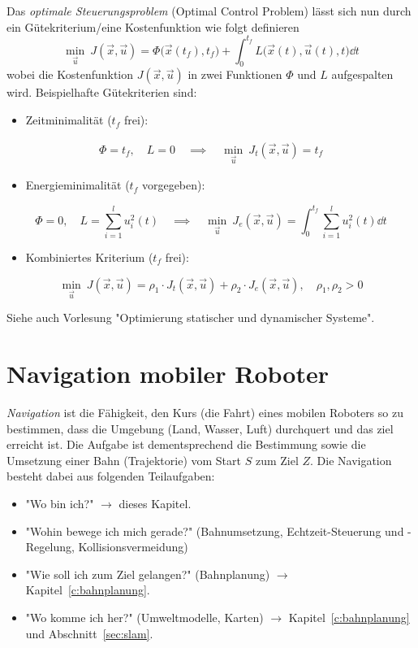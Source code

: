 			Das \emph{optimale Steuerungsproblem} (Optimal Control Problem) lässt sich nun durch ein Gütekriterium/eine Kostenfunktion wie folgt definieren
			\begin{equation*}
				\min_{\vec{u}} \> J(\vec{x}, \vec{u}) = \Phi\big(\vec{x}(t_f), t_f\big) + \int_{0}^{t_f} \! L\big(\vec{x}(t), \vec{u}(t), t\big) \dd{t}
			\end{equation*}
			wobei die Kostenfunktion \( J(\vec{x}, \vec{u}) \) in zwei Funktionen \( \Phi \) und \( L \) aufgespalten wird. Beispielhafte Gütekriterien sind:
			\begin{itemize}
				\item Zeitminimalität (\(t_f\) frei):
			\end{itemize}
			\begin{gather*}
				\Phi = t_f,\quad L = 0 \quad\implies\quad \min_{\vec{u}} \> J_t(\vec{x}, \vec{u}) = t_f
			\end{gather*}
			\begin{itemize}
				\item Energieminimalität (\(t_f\) vorgegeben):
			\end{itemize}
			\begin{equation*}
				\Phi = 0,\quad L = \sum_{i = 1}^{l} u_i^2 (t) \quad\implies\quad \min_{\vec{u}} \> J_e(\vec{x}, \vec{u}) = \int_{0}^{t_f} \! \sum_{i = 1}^{l} u_i^2 (t) \dd{t}
			\end{equation*}
			\begin{itemize}
				\item Kombiniertes Kriterium (\(t_f\) frei):
			\end{itemize}
			\begin{equation*}
				\min_{\vec{u}} \> J(\vec{x}, \vec{u}) = \rho_1 \cdot J_t(\vec{x}, \vec{u}) + \rho_2 \cdot J_e(\vec{x}, \vec{u}),\quad \rho_1, \rho_2 > 0
			\end{equation*}

			Siehe auch Vorlesung "Optimierung statischer und dynamischer Systeme".

\chapter{Navigation mobiler Roboter}
	\emph{Navigation} ist die Fähigkeit, den Kurs (die Fahrt) eines mobilen Roboters so zu bestimmen, dass die Umgebung (Land, Wasser, Luft) durchquert und das ziel erreicht ist. Die Aufgabe ist dementsprechend die Bestimmung sowie die Umsetzung einer Bahn (\bzw Trajektorie) vom Start \(S\) zum Ziel \(Z\). Die Navigation besteht dabei aus folgenden Teilaufgaben:
	\begin{itemize}
		\item "Wo bin ich?" \(\to\) dieses Kapitel.
		\item "Wohin bewege ich mich gerade?" (Bahnumsetzung, Echtzeit-Steuerung und -Regelung, Kollisionsvermeidung)
		\item "Wie soll ich zum Ziel gelangen?" (Bahnplanung) \(\to\) Kapitel~\ref{c:bahnplanung}.
		\item "Wo komme ich her?" (Umweltmodelle, Karten) \(\to\) Kapitel~\ref{c:bahnplanung} und Abschnitt~\ref{sec:slam}.
	\end{itemize}

